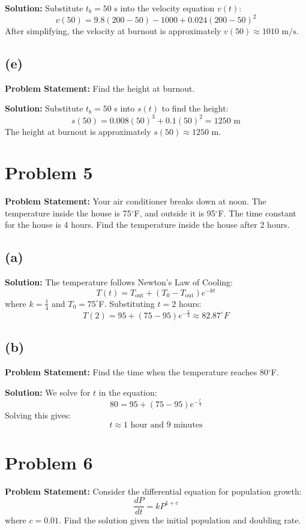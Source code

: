 \documentclass[12pt, letterpaper]{article}
\begin{document}
\textbf{Solution:}
Substitute $t_b = 50$ s into the velocity equation $v(t)$:
\[
v(50) = 9.8(200-50) - 1000 + 0.024(200-50)^2
\]
After simplifying, the velocity at burnout is approximately $v(50) \approx 1010 \text{ m/s}$.

\subsection*{(e)}
\textbf{Problem Statement:}
Find the height at burnout.

\textbf{Solution:}
Substitute $t_b = 50$ s into $s(t)$ to find the height:
\[
s(50) = 0.008(50)^3 + 0.1(50)^2 = 1250 \text{ m}
\]
The height at burnout is approximately $s(50) \approx 1250 \text{ m}$.

\section*{Problem 5}
\textbf{Problem Statement:}
Your air conditioner breaks down at noon. The temperature inside the house is 75$^\circ$F, and outside it is 95$^\circ$F. The time constant for the house is 4 hours. Find the temperature inside the house after 2 hours.

\subsection*{(a)}
\textbf{Solution:}
The temperature follows Newton's Law of Cooling:
\[
T(t) = T_{\text{out}} + (T_0 - T_{\text{out}}) e^{-kt}
\]
where $k = \frac{1}{4}$ and $T_0 = 75^\circ$F. Substituting $t = 2$ hours:
\[
T(2) = 95 + (75 - 95)e^{-\frac{2}{4}} \approx 82.87^\circ F
\]

\subsection*{(b)}
\textbf{Problem Statement:}
Find the time when the temperature reaches 80$^\circ$F.

\textbf{Solution:}
We solve for $t$ in the equation:
\[
80 = 95 + (75 - 95)e^{-\frac{t}{4}}
\]
Solving this gives:
\[
t \approx 1 \text{ hour and } 9 \text{ minutes}
\]

\section*{Problem 6}
\textbf{Problem Statement:}
Consider the differential equation for population growth:
\[
\frac{dP}{dt} = kP^{1+c}
\]
where $c = 0.01$. Find the solution given the initial population and doubling rate.
\end{document}
